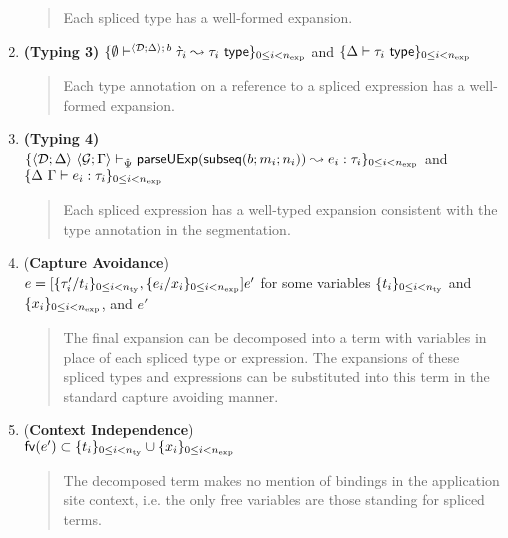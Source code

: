 \documentclass[acmsmall,review,anonymous]{acmart}\settopmatter{printfolios=true,printccs=false,printacmref=false}
\begin{document}
\begin{theorem}
\begin{enumerate}[nolistsep]
\begin{quote}
\begin{grayparbox}
        Each spliced type has a well-formed expansion.
        \end{grayparbox}
\end{quote}
\item \textbf{(Typing 3)} $\{
  \emptyset\vdash^{
    \langle \mathcal{D}; \Delta \rangle
      ;\,b
  } 
    \grave{\tau}_i
   \leadsto \tau_i~\mathsf{type}
\}_{0 \leq i < n_\text{exp}}$ and $\{\Delta \vdash \tau_i~\mathsf{type}\}_{0 \leq i < n_\text{exp}}$
    \begin{quote}
      \begin{grayparbox}
      Each type annotation on a reference to a spliced expression has a well-formed expansion.
      \end{grayparbox}
\end{quote}
\item \textbf{(Typing 4)} ~\\ $\{
  \langle \mathcal{D}; \Delta \rangle~\langle \mathcal{G}; \Gamma \rangle \vdash_{\hat{\Psi}} \mathsf{parseUExp}(\mathsf{subseq}(b; m_i; n_i)) \leadsto e_i : \tau_i
\}_{0 \leq i < n_\text{exp}}$ and $\{\Delta~\Gamma \vdash e_i : \tau_i\}_{0 \leq i < n_\text{exp}}$
    \begin{quote}
      \begin{grayparbox}
      Each spliced expression has a well-typed expansion consistent with the type annotation in the segmentation.
      \end{grayparbox}
\end{quote}
\item (\textbf{Capture Avoidance}) ~\\$e = [\{\tau'_i/t_i\}_{0 \leq i < n_\text{ty}}, \{e_i/x_i\}_{0 \leq i < n_\text{exp}}]e'$ for some variables $\{t_i\}_{0 \leq i < n_\text{ty}}$ and $\{x_i\}_{0 \leq i < n_\text{exp}}$, and $e'$
    \begin{quote}
    \begin{grayparbox}
      The final expansion can be decomposed into a  term with variables in place of each spliced type or expression. The expansions of these spliced types and expressions can be substituted into this term in the standard capture avoiding manner.
    \end{grayparbox}
    \end{quote}
\item (\textbf{Context Independence}) ~\\$\mathsf{fv}(e') \subset \{t_i\}_{0 \leq i < n_\text{ty}} \cup \{x_i\}_{0 \leq i < n_\text{exp}}$
    \begin{quote}
      \begin{grayparbox}

      The decomposed term makes no mention of bindings in the application site context, i.e. the only free variables are those standing for spliced terms.
      \end{grayparbox}
\end{quote}
\end{enumerate}
\end{theorem}
\end{document}
